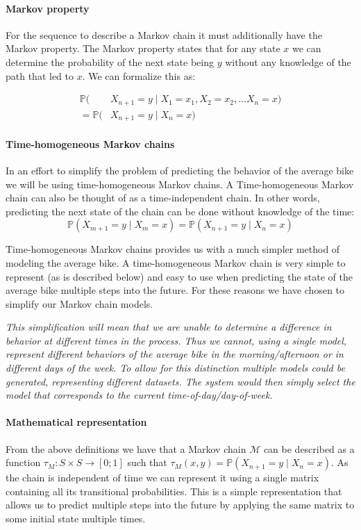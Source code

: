 \paragraph{Markov property}\label{markov:property}
For the sequence to describe a Markov chain it must additionally have the Markov property.
The Markov property states that for any state $x$ we can determine the probability of the next state being $y$ without any knowledge of the path that led to $x$.
We can formalize this as:

\begin{align}\label{markov:eq:markov_prob}
\mathbb{P}(&X_{n+1} = y \mid X_1 = x_1, X_2 = x_2, \dots X_n = x)\nonumber\\
= \mathbb{P}(&X_{n+1} = y \mid X_n = x)
\end{align}

\paragraph{Time-homogeneous Markov chains}
In an effort to simplify the problem of predicting the behavior of the average bike we will be using time-homogeneous Markov chains.
A Time-homogeneous Markov chain can also be thought of as a time-independent chain.
In other words, predicting the next state of the chain can be done without knowledge of the time:
\begin{equation}
\mathbb{P}(X_{m+1} = y \mid X_m = x) = \mathbb{P}(X_{n+1} = y \mid X_n = x)
\end{equation}

Time-homogeneous Markov chains provides us with a much simpler method of modeling the average bike.
A time-homogeneous Markov chain is very simple to represent (as is described below) and easy to use when predicting the state of the average bike multiple steps into the future.
For these reasons we have chosen to simplify our Markov chain models.

\textit{This simplification will mean that we are unable to determine a difference in behavior at different times in the process.
Thus we cannot, using a single model, represent different behaviors of the average bike in the morning/afternoon or in different days of the week.
To allow for this distinction multiple models could be generated, representing different datasets.
The system would then simply select the model that corresponds to the current time-of-day/day-of-week.}

\paragraph{Mathematical representation}\label{markov:math}
From the above definitions we have that a Markov chain $\mathcal{M}$ can be described as a function $\tau_M:S\times S \rightarrow [0;1]$ such that $\tau_M(x, y) = \mathbb{P}(X_{n + 1} = y \mid X_n = x)$.
As the chain is independent of time we can represent it using a single matrix containing all its transitional probabilities.
This is a simple representation that allows us to predict multiple steps into the future by applying the same matrix to some initial state multiple times.

